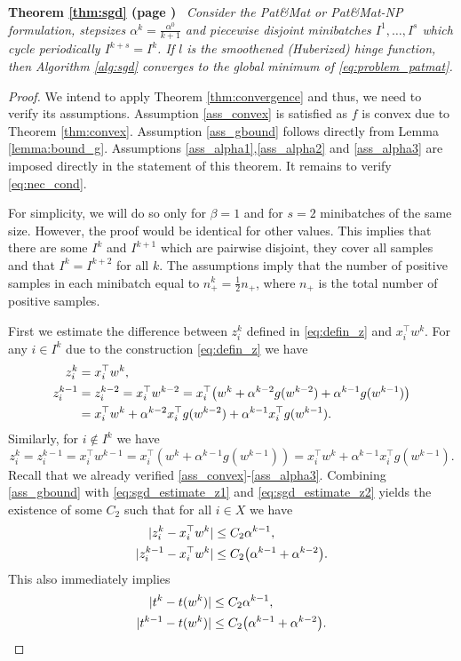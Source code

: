 \documentclass[]{interact}
\theoremstyle{plain}%
\theoremstyle{definition}
\theoremstyle{remark}
\newcommand{\nrm}[1]{|#1|}
\newcommand{\apatmat}{Pat\&Mat\xspace}
\newcommand{\anpB}{Pat\&Mat-NP\xspace}
\newcommand{\theoremNN}[2]{\noindent\textbf{Theorem \ref{#1} (page \pageref{#1})}\ \emph{#2}}
\begin{document}
\theoremNN{thm:sgd}{
  Consider the \apatmat or \anpB formulation, stepsizes $\alpha^k=\frac{\alpha^0}{k+1}$ and piecewise disjoint minibatches $I^1,\dots,I^s$ which cycle periodically $I^{k+s}=I^k$. If $l$ is the smoothened (Huberized) hinge function, then Algorithm \ref{alg:sgd} converges to the global minimum of \eqref{eq:problem_patmat}.  
}
\begin{proof}
We intend to apply Theorem \ref{thm:convergence} and thus, we need to verify its assumptions. Assumption \ref{ass_convex} is satisfied as $f$ is convex due to Theorem \ref{thm:convex}. Assumption \ref{ass_gbound} follows directly from Lemma \ref{lemma:bound_g}. Assumptions \ref{ass_alpha1},\ref{ass_alpha2} and \ref{ass_alpha3} are imposed directly in the statement of this theorem. It remains to verify \eqref{eq:nec_cond}.

For simplicity, we will do so only for $\beta=1$ and for $s=2$ minibatches of the same size. However, the proof would be identical for other values. This implies that there are some $I^k$ and $I^{k+1}$ which are pairwise disjoint, they cover all samples and that $I^k=I^{k+2}$ for all $k$. The assumptions imply that the number of positive samples in each minibatch equal to $n_+^k=\frac{1}{2}n_+$, where $n_+$ is the total number of positive samples.

First we estimate the difference between $z_i^k$ defined in \eqref{eq:defin_z} and $x_i^\top w^k$. For any $i\in I^k$ due to the construction \eqref{eq:defin_z} we have
\begin{equation}\label{eq:sgd_estimate_z1}
\aligned
z_i^k &= x_i^\top w^k, \\
z_i^{k-1} &= z_i^{k-2} = x_i^\top w^{k-2} = x_i^\top \big(w^k + \alpha^{k-2}g(w^{k-2}) + \alpha^{k-1}g(w^{k-1})\big) \\
&= x_i^\top w^k + \alpha^{k-2}x_i^\top g(w^{k-2}) + \alpha^{k-1}x_i^\top g(w^{k-1}).
\endaligned
\end{equation}
Similarly, for $i\notin I^k$ we have
\begin{equation}\label{eq:sgd_estimate_z2}
z_i^k=z_i^{k-1}=x_i^\top w^{k-1} = x_i^\top (w^k+\alpha^{k-1}g(w^{k-1})) = x_i^\top w^k + \alpha^{k-1}x_i^\top g(w^{k-1}).
\end{equation}
Recall that we already verified \ref{ass_convex}-\ref{ass_alpha3}. Combining \ref{ass_gbound} with \eqref{eq:sgd_estimate_z1} and \eqref{eq:sgd_estimate_z2} yields the existence of some $C_2$ such that for all $i\in X$ we have
\begin{equation}\label{eq:estimate_diff_z}
\aligned
\nrm{z_i^k - x_i^\top w^k} &\le C_2\alpha^{k-1}, \\
\nrm{z_i^{k-1} - x_i^\top w^k} &\le C_2\big(\alpha^{k-1}+\alpha^{k-2}\big). \\
\endaligned
\end{equation}
This also immediately implies
\begin{equation}\label{eq:estimate_diff_t}
\aligned
\nrm{t^k - t(w^k)} &\le C_2\alpha^{k-1}, \\
\nrm{t^{k-1} - t(w^k)} &\le C_2\big(\alpha^{k-1}+\alpha^{k-2}\big). \\
\endaligned
\end{equation}


\end{proof}
\end{document}
